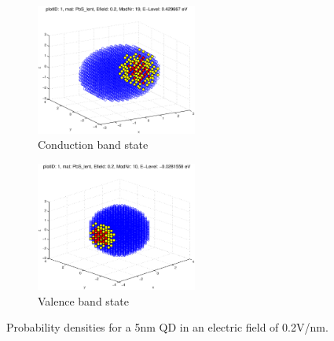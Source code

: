 \begin{figure}[htbp]
	\centering
	\begin{subfigure}{200px}
		\includegraphics[width=200px]{Fig/Plots/r25v02CB}
		\caption{Conduction band state}
	\end{subfigure}
	\begin{subfigure}{200px}
		\includegraphics[width=200px]{Fig/Plots/r25v02VB}
		\caption{Valence band state}
	\end{subfigure}	
	\caption{Probability densities for a 5nm QD in an electric field of 0.2V/nm.}
	\label{fig:EfieldWaveFn}
\end{figure}
%
